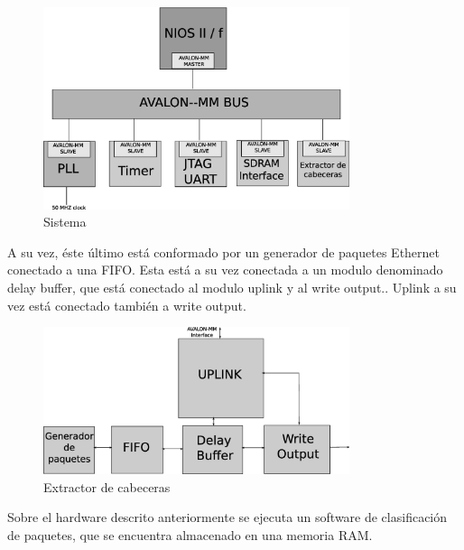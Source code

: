 \begin{figure}[h]
  \centering
	\includegraphics[width=0.80\textwidth]{2-sistema/graf/sistema.eps}
  \caption{Sistema}
  \label{fig}
\end{figure}

A su vez, éste último está conformado por un generador de paquetes Ethernet conectado a una FIFO. Esta está a su vez conectada a un modulo denominado delay buffer, que está conectado al modulo uplink y al write output.. Uplink a su vez está conectado también a write output.

\begin{figure}[h]
  \centering
	\includegraphics[width=0.80\textwidth]{2-sistema/graf/extractor.eps}
  \caption{Extractor de cabeceras}
  \label{fig}
\end{figure}

Sobre el hardware descrito anteriormente se ejecuta un software de clasificación de paquetes, que se encuentra almacenado en una memoria RAM.



